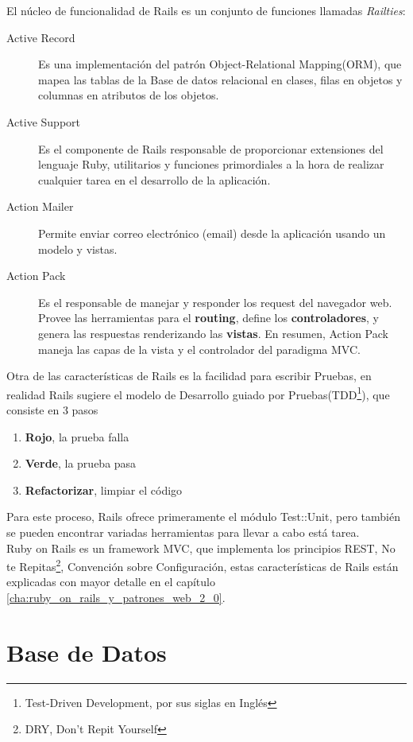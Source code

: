     El núcleo de funcionalidad de Rails es un conjunto de funciones llamadas \emph{Railties}:
    \begin{description}
      \item[Active Record] Es una implementaci\'on del patrón
        Object-Relational Mapping(ORM), que mapea las tablas de la Base de datos relacional en clases, filas en objetos y 
        columnas en atributos de los objetos.   
      \item[Active Support] Es el componente de Rails responsable de proporcionar extensiones del lenguaje Ruby, utilitarios y funciones primordiales a la hora de realizar cualquier tarea en el desarrollo de la aplicaci\'on.  
      \item[Action Mailer] Permite enviar correo electrónico (email) desde la aplicaci\'on usando un  modelo y vistas.
      \item[Action Pack] Es el responsable de manejar y responder los request del navegador web. Provee las herramientas para el \textbf{routing}, define los \textbf{controladores}, y genera las respuestas renderizando las \textbf{vistas}. En resumen, Action Pack maneja las capas de la vista y el controlador del paradigma MVC.  
    \end{description}
    Otra de las características de Rails es la facilidad para escribir Pruebas, en realidad Rails sugiere el modelo de Desarrollo guiado por Pruebas(TDD\footnote{Test-Driven Development, por sus siglas en Inglés}), que consiste en 3 pasos
    \begin{enumerate}
      \item \textbf{Rojo}, la prueba falla
      \item \textbf{Verde}, la prueba pasa
      \item \textbf{Refactorizar}, limpiar el código 
    \end{enumerate}
    Para este proceso, Rails ofrece primeramente el módulo Test::Unit, pero también se pueden encontrar variadas herramientas para llevar a cabo está tarea.\\

    Ruby on Rails es un framework MVC, que implementa los principios REST, No te Repitas\footnote{DRY, Don't Repit Yourself}, Convenci\'on sobre Configuraci\'on, estas características de Rails están explicadas con mayor detalle en el capítulo \ref{cha:ruby_on_rails_y_patrones_web_2_0}.



  \section{Base de Datos} %
  \label{sec:base_de_datos}

